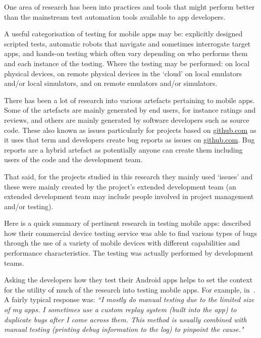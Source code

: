 One area of research has been into practices and tools that might perform better than the mainstream test automation tools available to app developers.

A useful categorisation of testing for mobile apps may be: 
explicitly designed scripted tests, 
automatic robots that navigate and sometimes interrogate target apps, and 
hands-on testing which often vary depending on who performs them and each instance of the testing. 
Where the testing may be performed:
on local physical devices,
on remote physical devices in the `cloud'
on local emulators and/or local simulators, and
on remote emulators and/or simulators.

There has been a lot of research into various artefacts pertaining to mobile apps. Some of the artefacts are mainly generated by end users, for instance ratings and reviews, and others are mainly generated by software developers such as source code. These also known as issues particularly for projects based on \href{https://github.com/}{github.com} as it uses that term and developers create bug reports as issues on \href{https://github.com/}{github.com}. Bug reports are a hybrid artefact as potentially anyone can create them including users of the code and the development team. 

That said, for the projects studied in this research they mainly used `issues' and these were mainly created by the project's extended development team (an extended development team may include people involved in project management and/or testing).

Here is a quick summary of pertinent research in testing mobile apps: \citeauthor{kaasila2012_testdroid_etc} described how their commercial device testing service was able to find various types of bugs through the use of a variety of mobile devices with different capabilities and performance characteristics. The testing was actually performed by development teams.

Asking the developers how they test their Android apps helps to set the context for the utility of much of the research into testing mobile apps. For example, in~. A fairly typical response was: \emph{``I mostly do manual testing due to the limited size of my apps. I sometimes use a custom replay system (built into the app) to duplicate bugs after I come across them. This method is usually combined with manual testing (printing debug information to the log) to pinpoint the cause."}
    

